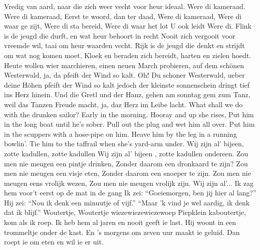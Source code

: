 \documentclass{article}
\begin{document}
\begin{songs}{}
Vredig van aard, naar die zich weer vecht voor heur ideaal.
Were di kameraad. Were di kameraad,
Eerst te woord, dan ter daad,
\endverse
\beginchorus
Were di kameraad,
Were di waar ge zijt,
Were di sta bereid,
Were di waar het lot U ook leidt
Were di.
\endchorus
\beginverse*
Flink is de jeugd die durft, en wat heur behoort in recht
Nooit zich vergooit voor vreemde wil, taai om heur waarden vecht.
\endverse
\beginverse*
Rijk is de jeugd die denkt en strijdt om wat nog komen moet,
Kloek en beraden zich bereidt, harten en zielen hoedt.
\endverse
\endsong
{}
\beginverse*
Heute wollen wier marchieren,
einen neuen March probieren,
auf dem schönen Westerwald,
ja, da pfeift der Wind so kalt.
\endverse
\beginverse*
Oh! Du schoner Westerwald,
ueber deine Höhen pfeift der Wind so kalt
jedoch der kleinste sonnenschein
dringt tief ins Herz hinein.
\endverse
\beginverse*
Und die Gretl und der Hanz,
gehen am sonntag gem zum Tanz,
weil das Tanzen Freude macht,
ja, daz Herz im Leibe lacht.
\endverse
\endsong
{}
\beginverse
What shall we do with the drunken sailor? 
\endverse
\beginchorus
Early in the morning.
\endchorus
\beginverse
Hooray and up she rises, 
\endverse
\beginverse
Put him in the long boat until he’s sober. 
\endverse
\beginverse
Pull out the plug and wet him all over. 
\endverse
\beginverse
Put him in the scuppers with a hose-pipe on him. 
\endverse
\beginverse
Heave him by the leg in a running bowlin’. 
\endverse
\beginverse
Tie him to the taffrail when she’s yard-arm under. 
\endverse
\endsong
{}
\beginverse*
Wij zijn al’ bijeen, zotte kadullen, zotte kadullen
Wij zijn al’ bijeen , zotte kadullen ondereen.
Zou men nie meugen een pintje drinken,
Zonder daarom een dronkaard te zijn?
Zou men nie meugen een visje eten,
Zonder daarom een snoeper te zijn.
Zou men nie meugen eens vrolijk wezen,
Zou men nie meugen vrolijk zijn.
\endverse
\beginverse*
Wij zijn al’...
\endverse
\endsong
{}
\beginverse*
Ik zag hem voor’t eerst op de mat in de gang
Ik zei: “Goeiemorgen, ben jij hier al lang?”
Hij zei: “Nou ik denk een minuutje of vijf.”
“Maar ’k vind je wel aardig, ik denk dat ik blijf.”
\endverse
\beginchorus
Woutertje, Woutertje wiezewiezewiezewoep
Piepklein kaboutertje, kom als ik roep. 
\endchorus
\beginverse*
Ik heb hem al jaren en nooit geeft ie last.
Hij woont in een trommeltje onder de kast.
En 's morgens om zeven uur maakt ie geluid.
Dan roept ie om eten en wil ie er uit.
\endverse

\end{songs}
\end{document}
